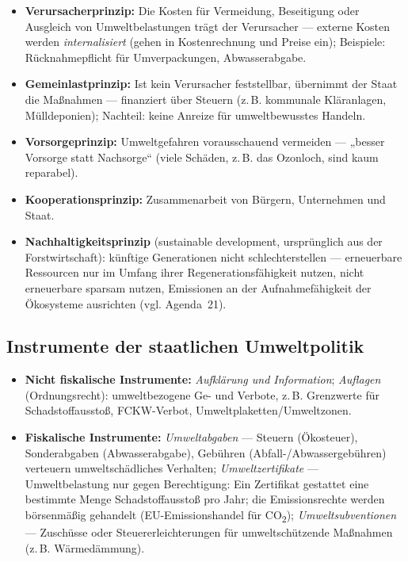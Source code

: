 \documentclass[11pt, a4paper]{article}
\begin{document}
\begin{itemize}
  \item \textbf{Verursacherprinzip:} Die Kosten für Vermeidung, Beseitigung oder Ausgleich
    von Umweltbelastungen trägt der Verursacher --- externe Kosten werden
    \emph{internalisiert} (gehen in Kostenrechnung und Preise ein); Beispiele:
    Rücknahmepflicht für Umverpackungen, Abwasserabgabe.
  \item \textbf{Gemeinlastprinzip:} Ist kein Verursacher feststellbar, übernimmt der Staat
    die Maßnahmen --- finanziert über Steuern (z.\,B. kommunale Kläranlagen, Mülldeponien);
    Nachteil: keine Anreize für umweltbewusstes Handeln.
  \item \textbf{Vorsorgeprinzip:} Umweltgefahren vorausschauend vermeiden --- „besser
    Vorsorge statt Nachsorge`` (viele Schäden, z.\,B. das Ozonloch, sind kaum reparabel).
  \item \textbf{Kooperationsprinzip:} Zusammenarbeit von Bürgern, Unternehmen und Staat.
  \item \textbf{Nachhaltigkeitsprinzip} (sustainable development, ursprünglich aus der
    Forstwirtschaft): künftige Generationen nicht schlechterstellen --- erneuerbare
    Ressourcen nur im Umfang ihrer Regenerationsfähigkeit nutzen, nicht erneuerbare sparsam
    nutzen, Emissionen an der Aufnahmefähigkeit der Ökosysteme ausrichten (vgl. Agenda~21).
\end{itemize}

\subsection{Instrumente der staatlichen Umweltpolitik}

\begin{itemize}
  \item \textbf{Nicht fiskalische Instrumente:} \emph{Aufklärung und Information};
    \emph{Auflagen} (Ordnungsrecht): umweltbezogene Ge- und Verbote, z.\,B. Grenzwerte für
    Schadstoffausstoß, FCKW-Verbot, Umweltplaketten/Umweltzonen.
  \item \textbf{Fiskalische Instrumente:}
    \emph{Umweltabgaben} --- Steuern (Ökosteuer), Sonderabgaben (Abwasserabgabe), Gebühren
    (Abfall-/Abwassergebühren) verteuern umweltschädliches Verhalten;
    \emph{Umweltzertifikate} --- Umweltbelastung nur gegen Berechtigung: Ein Zertifikat
    gestattet eine bestimmte Menge Schadstoffausstoß pro Jahr; die Emissionsrechte werden
    börsenmäßig gehandelt (EU-Emissionshandel für CO\textsubscript{2});
    \emph{Umweltsubventionen} --- Zuschüsse oder Steuererleichterungen für
    umweltschützende Maßnahmen (z.\,B. Wärmedämmung).
\end{itemize}
\end{document}
